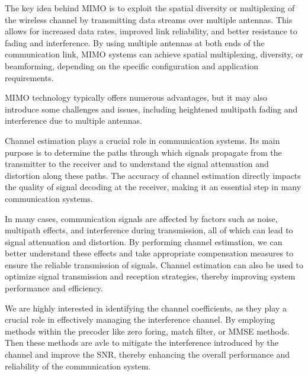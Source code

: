 \documentclass[journal,12pt,onecolumn,draftclsnofoot]{IEEEtran}
\begin{document}
        The key idea behind MIMO is to exploit the spatial diversity or multiplexing of the wireless channel by transmitting data streams over multiple antennas. 
        This allows for increased data rates, improved link reliability, and better resistance to fading and interference. By using multiple antennas at both ends 
        of the communication link, MIMO systems can achieve spatial multiplexing, diversity, or beamforming, depending on the specific configuration and application 
        requirements.

        MIMO technology typically offers numerous advantages, but it may also introduce some challenges and issues, including heightened multipath fading and 
        interference due to multiple antennas.

        Channel estimation plays a crucial role in communication systems. Its main purpose is to determine the paths through which signals propagate from the transmitter 
        to the receiver and to understand the signal attenuation and distortion along these paths. The accuracy of channel estimation directly impacts the quality of 
        signal decoding at the receiver, making it an essential step in many communication systems.

        In many cases, communication signals are affected by factors such as noise, multipath effects, and interference during transmission, all of which can lead to 
        signal attenuation and distortion. By performing channel estimation, we can better understand these effects and take appropriate compensation measures to ensure 
        the reliable transmission of signals. Channel estimation can also be used to optimize signal transmission and reception strategies, thereby improving system 
        performance and efficiency. %
        
        We are highly interested in identifying the channel coefficients, as they play a crucial role in effectively managing the interference channel. By employing 
        methods within the precoder like zero foring, match filter, or MMSE methods.
        Then these methods are avle to mitigate the interference introduced by the channel and improve the SNR, thereby enhancing the overall performance and 
        reliability of the communication system.\\
\end{document}
